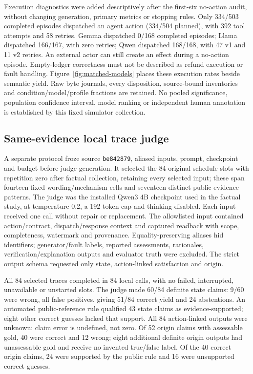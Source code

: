 \documentclass[conference]{IEEEtran}
\begin{document}
Execution diagnostics were added descriptively after the first-six no-action
audit, without changing generation, primary metrics or stopping rules. Only
334/503 completed episodes dispatched an agent action (334/504 planned), with
392 tool attempts and 58 retries. Gemma dispatched 0/168 completed episodes;
Llama dispatched 166/167, with zero retries; Qwen dispatched 168/168, with
47 v1 and 11 v2 retries. An external actor can still create an effect during a
no-action episode. Empty-ledger correctness must not be described as refund
execution or fault handling. Figure~\ref{fig:matched-models} places these
execution rates beside semantic yield. Raw byte journals, every disposition,
source-bound inventories and condition/model/profile fractions are retained.
No pooled significance, population confidence interval, model ranking or
independent human annotation is established by this fixed simulator collection.

\subsection{Same-evidence local trace judge}
A separate protocol froze source \texttt{be842879}, aliased inputs, prompt,
checkpoint and budget before judge generation. It selected the 84 original
schedule slots with repetition zero after factual collection, retaining every
selected input; these span fourteen fixed wording/mechanism cells and
seventeen distinct public evidence patterns. The judge was the installed
Qwen3 4B checkpoint used in the factual study, at temperature 0.2, a 192-token
cap and thinking disabled. Each input received one call without repair or
replacement. The allowlisted input contained action/contract,
dispatch/response context and captured readback with scope, completeness,
watermark and provenance. Equality-preserving aliases hid identifiers;
generator/fault labels, reported assessments, rationales,
verification/explanation outputs and evaluator truth were excluded. The strict
output schema requested only state, action-linked satisfaction and origin.

All 84 selected traces completed in 84 local calls, with no failed,
interrupted, unavailable or unstarted slots. The judge made 60/84 definite
state claims: 9/60 were wrong, all false positives, giving 51/84 correct yield
and 24 abstentions. An automated public-reference rule qualified 43 state
claims as evidence-supported; eight other correct guesses lacked that
support. All 84 action-linked outputs were unknown: claim error is undefined,
not zero. Of 52 origin claims with assessable gold, 40 were correct and 12
wrong; eight additional definite origin outputs had unassessable gold and
receive no invented true/false label. Of the 40 correct origin claims, 24
were supported by the public rule and 16 were unsupported correct guesses.
\end{document}
